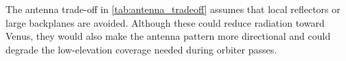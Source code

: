 The antenna trade-off in \autoref{tab:antenna_tradeoff} assumes that local reflectors or large backplanes are avoided. Although these could reduce radiation toward Venus, they would also make the antenna pattern more directional and could degrade the low-elevation coverage needed during orbiter passes.







